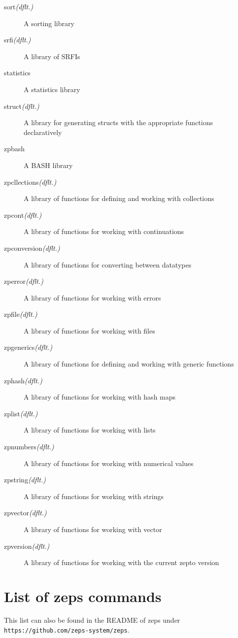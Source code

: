 \documentclass[oneside,11pt,xetex]{scrbook}
\begin{document}
\begin{description}
\item [sort\textit{(dflt.)}] A sorting library
\item [srfi\textit{(dflt.)}] A library of SRFIs
\item [statistics] A statistics library
\item [struct\textit{(dflt.)}] A library for generating structs with the appropriate functions
declaratively
\item [zpbash] A BASH library
\item [zpcllections\textit{(dflt.)}] A library of functions for defining and working with collections
\item [zpcont\textit{(dflt.)}] A library of functions for working with continuations
\item [zpconversion\textit{(dflt.)}] A library of functions for converting between datatypes
\item [zperror\textit{(dflt.)}] A library of functions for working with errors
\item [zpfile\textit{(dflt.)}] A library of functions for working with files
\item [zpgenerics\textit{(dflt.)}] A library of functions for defining and working with
generic functions
\item [zphash\textit{(dflt.)}] A library of functions for working with hash maps
\item [zplist\textit{(dflt.)}] A library of functions for working with lists
\item [zpnumbers\textit{(dflt.)}] A library of functions for working with numerical values
\item [zpstring\textit{(dflt.)}] A library of functions for working with strings
\item [zpvector\textit{(dflt.)}] A library of functions for working with vector
\item [zpversion\textit{(dflt.)}] A library of functions for working with the current zepto version
\end{description}

\chapter{List of \gls{zeps} commands}
\label{app:zepscmds}

This list can also be found in the README of zeps under
\texttt{https://github.com/zeps-system/zeps}.
\end{document}
